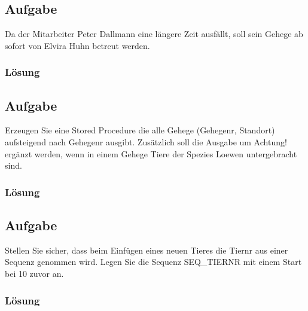 \subsection{Aufgabe}
\label{subsec:uebung_01.aufgabe_06}
Da der Mitarbeiter Peter Dallmann eine längere Zeit ausfällt, soll sein Gehege ab sofort von Elvira Huhn betreut werden.

\subsubsection*{Lösung}
\label{subsubsec:uebung_01.aufgabe_6.loesung}


\subsection{Aufgabe}
\label{subsec:uebung_01.aufgabe_07}
Erzeugen Sie eine Stored Procedure die alle Gehege (Gehegenr, Standort) aufsteigend nach Gehegenr ausgibt. Zusätzlich soll die Ausgabe um Achtung! ergänzt werden, wenn in einem Gehege Tiere der Spezies Loewen untergebracht sind.

\subsubsection*{Lösung}
\label{subsubsec:uebung_01.aufgabe_7.loesung}


\subsection{Aufgabe}
\label{subsec:uebung_01.aufgabe_08}
Stellen Sie sicher, dass beim Einfügen eines neuen Tieres die Tiernr aus einer Sequenz genommen wird. Legen Sie die Sequenz SEQ\_TIERNR mit einem Start bei 10 zuvor an.

\subsubsection*{Lösung}
\label{subsubsec:uebung_01.aufgabe_8.loesung}


